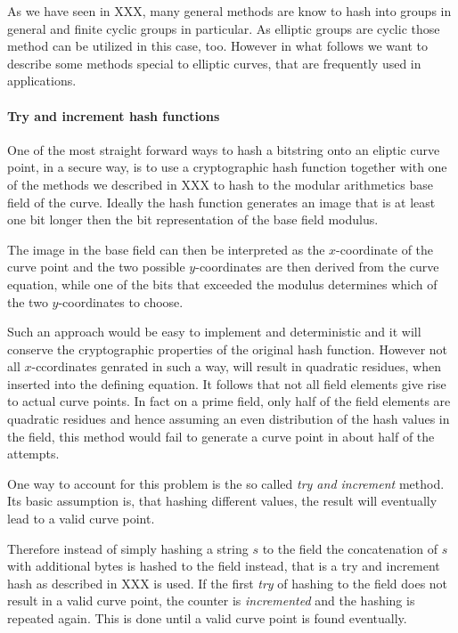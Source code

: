 As we have seen in XXX, many general methods are know to hash into groups in general and finite cyclic groups in particular. As elliptic groups are cyclic those method can be utilized in this case, too. However in what follows we want to describe some methods special to elliptic curves, that are frequently used in applications.
\paragraph{Try and increment hash functions}
One of the most straight forward ways to hash a bitstring onto an eliptic curve point, in a  secure way, is to use a cryptographic hash function together with one of the methods we described in XXX to hash to the modular arithmetics base field of the curve. Ideally the hash function generates an image that is at least one bit longer then the bit representation of the base field modulus.

The image in the base field can then be interpreted as the $x$-coordinate of the curve point and the two possible $y$-coordinates are then derived from the curve equation, while one of the bits that exceeded the modulus determines which of the two $y$-coordinates to choose.

Such an approach would be easy to implement and deterministic and it will conserve the cryptographic properties of the original hash function. However not all $x$-ccordinates genrated in such a way, will result in quadratic residues, when inserted into the defining equation. It follows that not all field elements give rise to actual curve points. In fact
on a prime field, only half of the field elements are quadratic residues and hence assuming an even distribution of the hash values in the field, this method would fail to generate a curve point in about half of the attempts.

One way to account for this problem is the so called \textit{try and increment} method. Its basic assumption is, that hashing different values, the result will eventually lead to a valid curve point.

Therefore instead of simply hashing a string $s$ to the field the concatenation of $s$ with additional bytes is hashed to the field instead, that is a try and increment hash as described in XXX is used. If the first \textit{try} of hashing to the field does not result in a valid curve point, the counter is \textit{incremented} and the hashing is repeated again. This is done until a valid curve point is found eventually.

